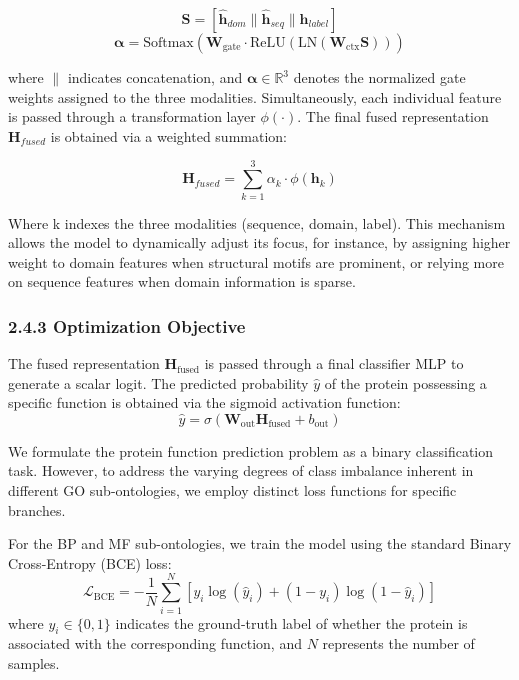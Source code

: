 \documentclass[unnumsec,webpdf,contemporary,large]{oup-authoring-template}%
\theoremstyle{thmstyleone}%
\theoremstyle{thmstyletwo}%
\theoremstyle{thmstylethree}%
\begin{document}
\begin{equation}
    \mathbf{S} = [\hat{\mathbf{h}}_{dom} \parallel \hat{\mathbf{h}}_{seq} \parallel \mathbf{h}_{label}]
\end{equation}
\begin{equation}
    \boldsymbol{\alpha} = \text{Softmax}(\mathbf{W}_{\text{gate}} \cdot \text{ReLU}(\text{LN}(\mathbf{W}_{\text{ctx}}\mathbf{S})))
\end{equation}

where $\parallel$ indicates concatenation, and $\boldsymbol{\alpha} \in \mathbb{R}^{3}$ denotes the normalized gate weights assigned to the three modalities. Simultaneously, each individual feature is passed through a transformation layer $\phi(\cdot)$. The final fused representation $\mathbf{H}_{fused}$ is obtained via a weighted summation:

\begin{equation}
    \mathbf{H}_{fused} = \sum_{k=1}^{3} \alpha_k \cdot \phi(\mathbf{h}_k)
\end{equation}

Where k indexes the three modalities (sequence, domain, label).
This mechanism allows the model to dynamically adjust its focus, for instance, by assigning higher weight to domain features when structural motifs are prominent, or relying more on sequence features when domain information is sparse.

\subsubsection{2.4.3 Optimization Objective}
The fused representation $\mathbf{H}_{\text{fused}}$ is passed through a final classifier MLP to generate a scalar logit. The predicted probability $\hat{y}$ of the protein possessing a specific function is obtained via the sigmoid activation function:
\begin{equation}
    \hat{y} = \sigma(\mathbf{W}_{\text{out}}\mathbf{H}_{\text{fused}} + b_{\text{out}})
\end{equation}

We formulate the protein function prediction problem as a binary classification task. However, to address the varying degrees of class imbalance inherent in different GO sub-ontologies, we employ distinct loss functions for specific branches.

For the BP and MF sub-ontologies, we train the model using the standard Binary Cross-Entropy (BCE) loss:
\begin{equation}
    \mathcal{L}_{\text{BCE}} = -\frac{1}{N} \sum_{i=1}^{N} \left[ y_i \log(\hat{y}_i) + (1 - y_i) \log(1 - \hat{y}_i) \right]
\end{equation}
where $y_i \in \{0, 1\}$ indicates the ground-truth label of whether the protein is associated with the corresponding function, and $N$ represents the number of samples.
\end{document}
